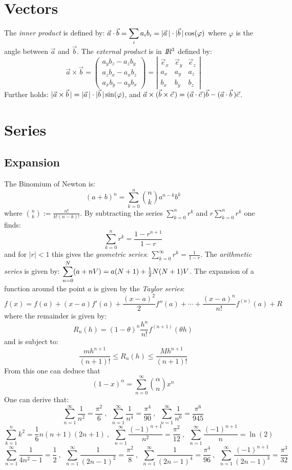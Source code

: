 \documentclass[twoside]{report}
\begin{document}
\section{Vectors}
The {\it inner product} is defined by:
$\displaystyle\vec{a}\cdot\vec{b}=\sum_i a_ib_i=|\vec{a}\,|\cdot|\vec{b}\,|\cos(\varphi)$
\npar
where $\varphi$ is the angle between $\vec{a}$ and $\vec{b}$. The {\it external
product} is in $I\hspace{-1mm}R^3$ defined by:
\[
\vec{a}\times\vec{b}=\left(\begin{array}{c}
a_yb_z-a_zb_y\\
a_zb_x-a_xb_z\\
a_xb_y-a_yb_x\end{array}\right)=
\left|\begin{array}{ccc}
\vec{e}_x&\vec{e}_y&\vec{e}_z\\
a_x&a_y&a_z\\
b_x&b_y&b_z\end{array}\right|
\]
Further holds: $|\vec{a}\times\vec{b}\,|=|\vec{a}\,|\cdot|\vec{b}\,|\sin(\varphi)$, and
$\vec{a}\times(\vec{b}\times\vec{c}\,)=(\vec{a}\cdot\vec{c}\,)\vec{b}-(\vec{a}\cdot\vec{b}\,)\vec{c}$.

\section{Series}
\subsection{Expansion}
The Binomium of Newton is:
\[
(a+b)^n=\sum_{k=0}^n{n\choose k}a^{n-k}b^k
\]
where $\displaystyle{n\choose k}:=\frac{n!}{k!(n-k)!}$.
\npar
By subtracting the series $\sum\limits_{k=0}^n r^k$ and $r\sum\limits_{k=0}^n r^k$
one finds:
\[
\sum_{k=0}^n r^k=\frac{1-r^{n+1}}{1-r}
\]
and for $|r|<1$ this gives the {\it geometric series}:
$\displaystyle\sum_{k=0}^\infty r^k=\frac{1}{1-r}$.
\npar
The {\it arithmetic series} is given by:
$\displaystyle\sum_{n=0}^N(a+nV)=a(N+1)+\mbox{$\frac{1}{2}$} N(N+1)V$.
\npar
The expansion of a function around the point $a$ is given by the
{\it Taylor series}:
\[
f(x)=f(a)+(x-a)f'(a)+\frac{(x-a)^2}{2}f''(a)+\cdots+\frac{(x-a)^n}{n!}f^{(n)}(a)+R
\]
where the remainder is given by:
\[
R_n(h)=(1-\theta)^n\frac{h^n}{n!}f^{(n+1)}(\theta h)
\]
and is subject to:
\[
\frac{mh^{n+1}}{(n+1)!}\leq R_n(h)\leq\frac{Mh^{n+1}}{(n+1)!}
\]
From this one can deduce that
\[
(1-x)^\alpha=\sum_{n=0}^\infty{\alpha\choose n}x^n
\]
One can derive that:
\[
\sum_{n=1}^\infty\frac{1}{n^2}=\frac{\pi^2}{6}~,~~
\sum_{n=1}^\infty\frac{1}{n^4}=\frac{\pi^4}{90}~,~~
\sum_{n=1}^\infty\frac{1}{n^6}=\frac{\pi^6}{945}
\]
\[
\sum_{k=1}^nk^2=\mbox{$\frac{1}{6}$}n(n+1)(2n+1)~,~~
\sum_{n=1}^\infty\frac{(-1)^{n+1}}{n^2}=\frac{\pi^2}{12}~,~~
\sum_{n=1}^\infty\frac{(-1)^{n+1}}{n}=\ln(2)
\]
\[
\sum_{n=1}^\infty\frac{1}{4n^2-1}=\mbox{$\frac{1}{2}$}~,~~
\sum_{n=1}^\infty\frac{1}{(2n-1)^2}=\frac{\pi^2}{8}~,~~
\sum_{n=1}^\infty\frac{1}{(2n-1)^4}=\frac{\pi^4}{96}~,~~
\sum_{n=1}^\infty\frac{(-1)^{n+1}}{(2n-1)^3}=\frac{\pi^3}{32}
\]
\end{document}
